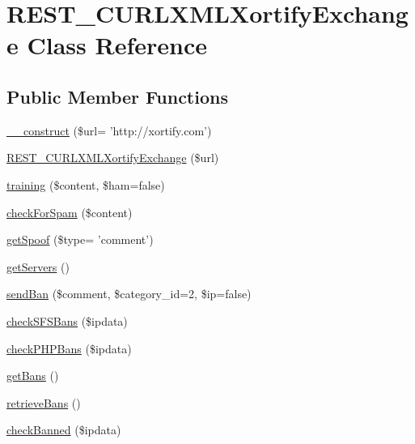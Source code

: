 \hypertarget{class_r_e_s_t___c_u_r_l_x_m_l_xortify_exchange}{\section{R\-E\-S\-T\-\_\-\-C\-U\-R\-L\-X\-M\-L\-Xortify\-Exchange Class Reference}
\label{class_r_e_s_t___c_u_r_l_x_m_l_xortify_exchange}
}
\subsection*{Public Member Functions}
\begin{DoxyCompactItemize}
\item 
\hyperlink{class_r_e_s_t___c_u_r_l_x_m_l_xortify_exchange_a0e33a9b5cea89315431b2d440e576d5f}{\-\_\-\-\_\-construct} (\$url= 'http\-://xortify.\-com')
\item 
\hyperlink{class_r_e_s_t___c_u_r_l_x_m_l_xortify_exchange_ab6114b6ef43b544c6ca514f363f88e45}{R\-E\-S\-T\-\_\-\-C\-U\-R\-L\-X\-M\-L\-Xortify\-Exchange} (\$url)
\item 
\hyperlink{class_r_e_s_t___c_u_r_l_x_m_l_xortify_exchange_a3b3be735e633ba330c6b5d086aa508cd}{training} (\$content, \$ham=false)
\item 
\hyperlink{class_r_e_s_t___c_u_r_l_x_m_l_xortify_exchange_a7a4f53c3841dc7806455261af557d514}{check\-For\-Spam} (\$content)
\item 
\hyperlink{class_r_e_s_t___c_u_r_l_x_m_l_xortify_exchange_ae7926cba79660f77479306100f492c03}{get\-Spoof} (\$type= 'comment')
\item 
\hyperlink{class_r_e_s_t___c_u_r_l_x_m_l_xortify_exchange_a882f365bc81e207dc2123ef707735e82}{get\-Servers} ()
\item 
\hyperlink{class_r_e_s_t___c_u_r_l_x_m_l_xortify_exchange_a0293acfa4afe0cb5b2816352a35d8ca7}{send\-Ban} (\$comment, \$category\-\_\-id=2, \$ip=false)
\item 
\hyperlink{class_r_e_s_t___c_u_r_l_x_m_l_xortify_exchange_a985a563a84e3e5c54694fcce192bda53}{check\-S\-F\-S\-Bans} (\$ipdata)
\item 
\hyperlink{class_r_e_s_t___c_u_r_l_x_m_l_xortify_exchange_aeb1bf9aaee4718870adbd07333490aaf}{check\-P\-H\-P\-Bans} (\$ipdata)
\item 
\hyperlink{class_r_e_s_t___c_u_r_l_x_m_l_xortify_exchange_aea26db2906896833d32445a698fc4cdc}{get\-Bans} ()
\item 
\hyperlink{class_r_e_s_t___c_u_r_l_x_m_l_xortify_exchange_a4af29af927aae9aada97ef0c2cd08fa1}{retrieve\-Bans} ()
\item 
\hyperlink{class_r_e_s_t___c_u_r_l_x_m_l_xortify_exchange_ae41df0f26620b727f7f63342648f6474}{check\-Banned} (\$ipdata)
\end{DoxyCompactItemize}
